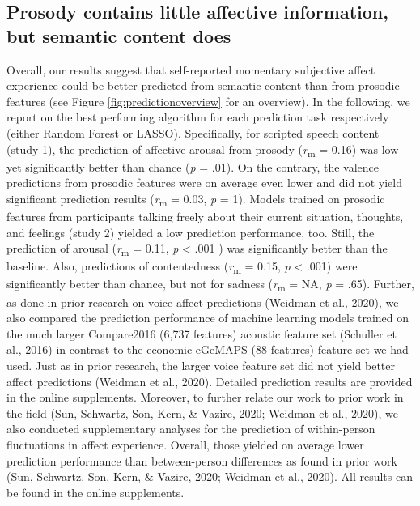 \documentclass[
  english,
  man,floatsintext]{apa6}
\begin{document}
\hypertarget{prosody-contains-little-affective-information-but-semantic-content-does}{%
\subsection{Prosody contains little affective information, but semantic content does}\label{prosody-contains-little-affective-information-but-semantic-content-does}}

Overall, our results suggest that self-reported momentary subjective affect experience could be better predicted from semantic content than from prosodic features (see Figure \ref{fig:predictionoverview} for an overview). In the following, we report on the best performing algorithm for each prediction task respectively (either Random Forest or LASSO). Specifically, for scripted speech content (study 1), the prediction of affective arousal from prosody (\emph{r}\textsubscript{m} = 0.16) was low yet significantly better than chance (\emph{p} = .01). On the contrary, the valence predictions from prosodic features were on average even lower and did not yield significant prediction results (\emph{r}\textsubscript{m} = 0.03, \emph{p} = 1). Models trained on prosodic features from participants talking freely about their current situation, thoughts, and feelings (study 2) yielded a low prediction performance, too. Still, the prediction of arousal (\emph{r}\textsubscript{m} = 0.11, \emph{p} \textless{} .001 ) was significantly better than the baseline. Also, predictions of contentedness (\emph{r}\textsubscript{m} = 0.15, \emph{p} \textless{} .001) were significantly better than chance, but not for sadness (\emph{r}\textsubscript{m} = NA, \emph{p} = .65).
Further, as done in prior research on voice-affect predictions (Weidman et al., 2020), we also compared the prediction performance of machine learning models trained on the much larger Compare2016 (6,737 features) acoustic feature set (Schuller et al., 2016) in contrast to the economic eGeMAPS (88 features) feature set we had used. Just as in prior research, the larger voice feature set did not yield better affect predictions (Weidman et al., 2020). Detailed prediction results are provided in the online supplements. Moreover, to further relate our work to prior work in the field (Sun, Schwartz, Son, Kern, \& Vazire, 2020; Weidman et al., 2020), we also conducted supplementary analyses for the prediction of within-person fluctuations in affect experience. Overall, those yielded on average lower prediction performance than between-person differences as found in prior work (Sun, Schwartz, Son, Kern, \& Vazire, 2020; Weidman et al., 2020). All results can be found in the online supplements.
\end{document}
